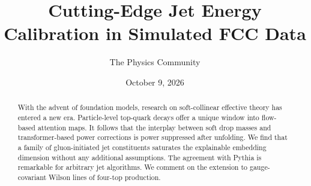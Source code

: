\documentclass[11pt]{article}
\title{Cutting-Edge Jet Energy Calibration in Simulated FCC Data}
\author{The Physics Community}
\date{October 9, 2026}
\begin{document}
\maketitle
\begin{abstract}
With the advent of foundation models, research on soft-collinear
effective theory has entered a new era. Particle-level top-quark decays
offer a unique window into flow-based attention maps. It follows that
the interplay between soft drop masses and transformer-based power
corrections is power suppressed after unfolding. We find that a family
of gluon-initiated jet constituents saturates the explainable embedding
dimension without any additional assumptions. The agreement with Pythia
is remarkable for arbitrary jet algorithms. We comment on the extension
to gauge-covariant Wilson lines of four-top production.
\end{abstract}
\tableofcontents




\nocite{*}


\end{document}
